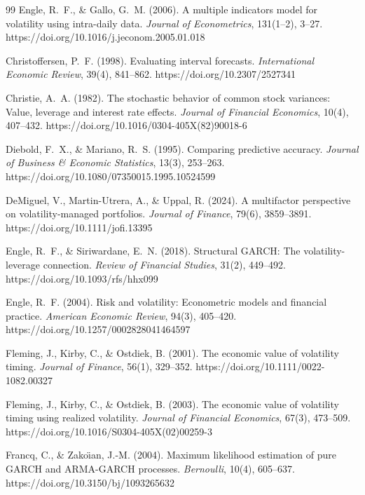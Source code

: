 \documentclass[12pt,a4paper]{article}
\begin{document}
\begin{thebibliography}{99}
Engle, R.~F., \& Gallo, G.~M. (2006). A multiple indicators model for volatility using intra-daily data. \textit{Journal of Econometrics}, 131(1--2), 3--27. https://doi.org/10.1016/j.jeconom.2005.01.018

Christoffersen, P.~F. (1998). Evaluating interval forecasts. \textit{International Economic Review}, 39(4), 841--862. https://doi.org/10.2307/2527341

Christie, A.~A. (1982). The stochastic behavior of common stock variances: Value, leverage and interest rate effects. \textit{Journal of Financial Economics}, 10(4), 407--432. https://doi.org/10.1016/0304-405X(82)90018-6

Diebold, F.~X., \& Mariano, R.~S. (1995). Comparing predictive accuracy. \textit{Journal of Business \& Economic Statistics}, 13(3), 253--263. https://doi.org/10.1080/07350015.1995.10524599

DeMiguel, V., Martin-Utrera, A., \& Uppal, R. (2024). A multifactor perspective on volatility-managed portfolios. \textit{Journal of Finance}, 79(6), 3859--3891. https://doi.org/10.1111/jofi.13395

Engle, R.~F., \& Siriwardane, E.~N. (2018). Structural GARCH: The volatility-leverage connection. \textit{Review of Financial Studies}, 31(2), 449--492. https://doi.org/10.1093/rfs/hhx099

Engle, R.~F. (2004). Risk and volatility: Econometric models and financial practice. \textit{American Economic Review}, 94(3), 405--420. https://doi.org/10.1257/0002828041464597

Fleming, J., Kirby, C., \& Ostdiek, B. (2001). The economic value of volatility timing. \textit{Journal of Finance}, 56(1), 329--352. https://doi.org/10.1111/0022-1082.00327

Fleming, J., Kirby, C., \& Ostdiek, B. (2003). The economic value of volatility timing using realized volatility. \textit{Journal of Financial Economics}, 67(3), 473--509. https://doi.org/10.1016/S0304-405X(02)00259-3

Francq, C., \& Zako\"{\i}an, J.-M. (2004). Maximum likelihood estimation of pure GARCH and ARMA-GARCH processes. \textit{Bernoulli}, 10(4), 605--637. https://doi.org/10.3150/bj/1093265632


\end{thebibliography}
\end{document}
